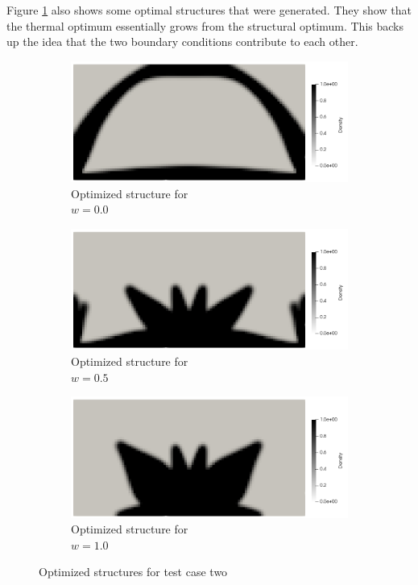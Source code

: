 Figure \ref{fig:test_case_two_structures} also shows some optimal structures that were generated. They show that the thermal optimum essentially grows from the structural optimum. This backs up the idea that the two boundary conditions contribute to each other.
\begin{figure}[ht]
    \begin{subfigure}[b]{0.3\linewidth}
        \includegraphics[width=\linewidth]{figures/chapter_6/Case1_MF_0to1.png}
        \caption{Optimized structure for \\$w=0.0$}
    \end{subfigure}
    \hfill
    \begin{subfigure}[b]{0.3\linewidth}
        \includegraphics[width=\linewidth]{figures/chapter_6/Case1_MF_1to1.png}
        \caption{Optimized structure for \\$w=0.5$}
    \end{subfigure}
    \hfill
    \begin{subfigure}[b]{0.3\linewidth}
        \includegraphics[width=\linewidth]{figures/chapter_6/Case1_MF_1to0.png}
        \caption{Optimized structure for \\$w=1.0$}
    \end{subfigure}
    \caption{Optimized structures for test case two}
    \label{fig:test_case_two_structures}
\end{figure}

